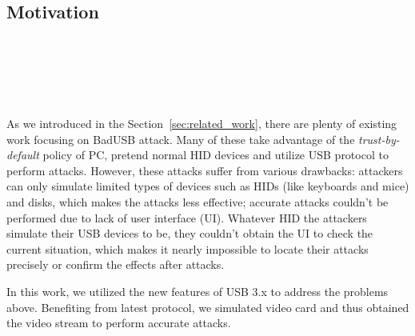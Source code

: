 \section{\tool}
\label{sec:badusb}
\subsection{Motivation}
\noindent{}\\
\\
\\
\\
\\
As we introduced in the Section~\ref{sec:related_work}, there are plenty of existing work  focusing on BadUSB attack. 
Many of these take advantage of the \textit{trust-by-default} policy of PC, pretend normal HID devices and utilize USB protocol to perform attacks. 
However, these attacks suffer from various drawbacks:
 attackers can only simulate limited types of devices such as HIDs (like keyboards and mice) and disks, which makes the attacks less effective;
 accurate attacks couldn't be performed due to lack of user interface (UI).
Whatever HID the attackers simulate their USB devices to be, they couldn't obtain the UI to check the current situation, which makes it nearly impossible to locate their attacks precisely or confirm the effects after attacks.

In this work, we utilized the new features of USB 3.x \cite{usb31} \cite{usb32} to address the problems above.
Benefiting from latest protocol, we simulated video card and thus obtained the video stream to perform accurate attacks.

